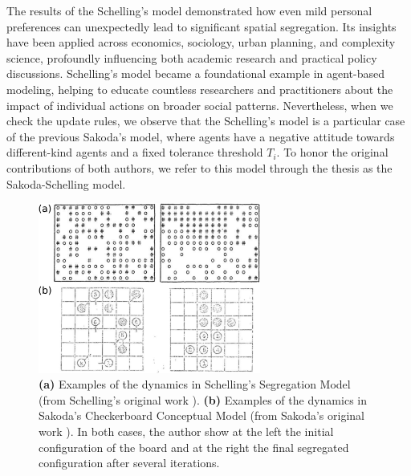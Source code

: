 The results of the Schelling's model demonstrated how even mild personal preferences can unexpectedly lead to significant spatial segregation. Its insights have been applied across economics, sociology, urban planning, and complexity science, profoundly influencing both academic research and practical policy discussions. Schelling's model became a foundational example in agent-based modeling, helping to educate countless researchers and practitioners about the impact of individual actions on broader social patterns. Nevertheless, when we check the update rules, we observe that the Schelling's model is a particular case of the previous Sakoda's model, where agents have a negative attitude towards different-kind agents and a fixed tolerance threshold $T_i$. To honor the original contributions of both authors, we refer to this model through the thesis as the Sakoda-Schelling model.

\begin{figure}
    \centering
    \captionsetup{font=sf}
    \includegraphics[width=0.65\textwidth]{Figs/Introduction/schelling_diagrams.pdf}
    \caption[Schelling and Sakoda checkerboard examples]{\textbf{(a)} Examples of the dynamics in Schelling's Segregation Model (from Schelling's original work \cite{Schelling}). \textbf{(b)} Examples of the dynamics in Sakoda’s Checkerboard Conceptual Model (from Sakoda's original work \cite{sakoda1949minidoka}). In both cases, the author show at the left the initial configuration of the board and at the right the final segregated configuration after several iterations.}
    \label{fig:Schelling_fig}
\end{figure}

